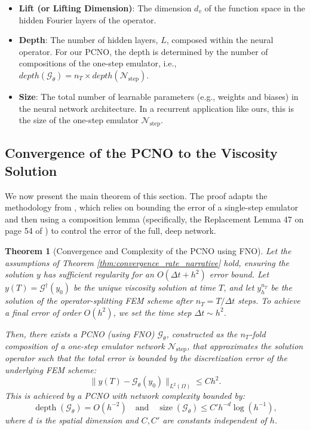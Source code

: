 \documentclass[pdflatex,sn-mathphys-num]{sn-jnl}%
\theoremstyle{thmstyleone}%
\newtheorem{thm}{Theorem}[section]
\numberwithin{equation}{section}
\begin{document}
\begin{itemize}
    \item \textbf{Lift (or Lifting Dimension)}: The dimension $d_v$ of the function space in the hidden Fourier layers of the operator.
    \item \textbf{Depth}: The number of hidden layers, $L$, composed within the neural operator. For our PCNO, the depth is determined by the number of compositions of the one-step emulator, i.e., $depth(\mathcal{G}_\theta) = n_T \times depth(\mathcal{N}_{\text{step}})$.
    \item \textbf{Size}: The total number of learnable parameters (e.g., weights and biases) in the neural network architecture. In a recurrent application like ours, this is the size of the one-step emulator $\mathcal{N}_{\text{step}}$.
\end{itemize}

\subsection{Convergence of the PCNO to the Viscosity Solution}

We now present the main theorem of this section. The proof adapts the methodology from \cite{kovachki2021universal}, which relies on bounding the error of a single-step emulator and then using a composition lemma (specifically, the Replacement Lemma 47 on page 54 of \cite{kovachki2021universal}) to control the error of the full, deep network.

\begin{thm}[Convergence and Complexity of the PCNO using FNO]
\label{thm:pcno_convergence_revised}
Let the assumptions of Theorem \ref{thm:convergence_rate_narrative} hold, ensuring the solution $y$ has sufficient regularity for an $O(\Delta t + h^2)$ error bound. Let $y(T) = \mathcal{G}^\dagger(y_0)$ be the unique viscosity solution at time $T$, and let $y_h^{n_T}$ be the solution of the operator-splitting FEM scheme after $n_T=T/\Delta t$ steps. To achieve a final error of order $O(h^2)$, we set the time step $\Delta t \sim h^2$.

Then, there exists a PCNO (using FNO) $\mathcal{G}_\theta$, constructed as the $n_T$-fold composition of a one-step emulator network $\mathcal{N}_{\text{step}}$, that approximates the solution operator such that the total error is bounded by the discretization error of the underlying FEM scheme:
$$ \| y(T) - \mathcal{G}_\theta(y_0) \|_{L^2(\Omega)} \leq C h^2. $$
This is achieved by a PCNO with network complexity bounded by:
$$ \operatorname{depth}(\mathcal{G}_\theta) = O(h^{-2}) \quad \text{and} \quad \operatorname{size}(\mathcal{G}_\theta) \le C' h^{-d} \log(h^{-1}), $$
where $d$ is the spatial dimension and $C, C'$ are constants independent of $h$.
\end{thm}
\end{document}
